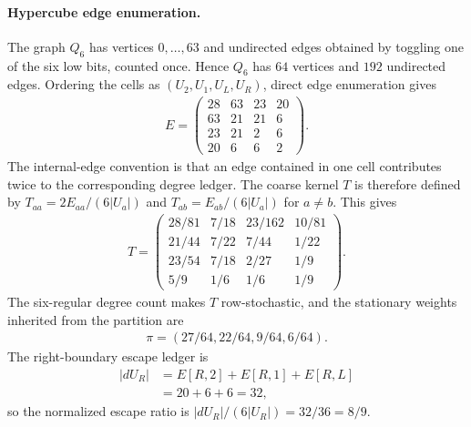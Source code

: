 \paragraph{Hypercube edge enumeration.}
The graph $Q_6$ has vertices $0,\ldots,63$ and undirected edges obtained by toggling one of the six low bits, counted once. Hence $Q_6$ has $64$ vertices and $192$ undirected edges. Ordering the cells as $(U_2,U_1,U_L,U_R)$, direct edge enumeration gives
$$
\begin{aligned}
E=\begin{pmatrix}
28&63&23&20\\
63&21&21&6\\
23&21&2&6\\
20&6&6&2
\end{pmatrix}.
\end{aligned}
$$
The internal-edge convention is that an edge contained in one cell contributes twice to the corresponding degree ledger. The coarse kernel $T$ is therefore defined by $T_{aa}=2E_{aa}/(6|U_a|)$ and $T_{ab}=E_{ab}/(6|U_a|)$ for $a\neq b$. This gives
$$
\begin{aligned}
T=\begin{pmatrix}
28/81&7/18&23/162&10/81\\
21/44&7/22&7/44&1/22\\
23/54&7/18&2/27&1/9\\
5/9&1/6&1/6&1/9
\end{pmatrix}.
\end{aligned}
$$
The six-regular degree count makes $T$ row-stochastic, and the stationary weights inherited from the partition are
$$
\begin{aligned}
\pi=(27/64,22/64,9/64,6/64).
\end{aligned}
$$
The right-boundary escape ledger is
$$
\begin{aligned}
|dU_R|&=E[R,2]+E[R,1]+E[R,L]\\
&=20+6+6=32,
\end{aligned}
$$
so the normalized escape ratio is $|dU_R|/(6|U_R|)=32/36=8/9$.

